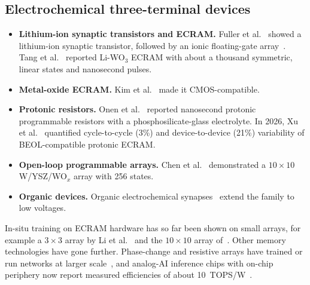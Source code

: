 \subsection{Electrochemical three-terminal devices}
\begin{itemize}
\item \textbf{Lithium-ion synaptic transistors and ECRAM.} Fuller et al.~\cite{fuller2017} showed a lithium-ion synaptic
      transistor, followed by an ionic floating-gate array~\cite{fuller2019}. Tang et al.~\cite{tang2018} reported Li-WO$_3$ ECRAM
      with about a thousand symmetric, linear states and nanosecond pulses.
\item \textbf{Metal-oxide ECRAM.} Kim et al.~\cite{kim2019} made it CMOS-compatible.
\item \textbf{Protonic resistors.} Onen et al.~\cite{onen2022} reported nanosecond protonic programmable resistors with a
      phosphosilicate-glass electrolyte. In 2026, Xu et al.~\cite{xu2026} quantified cycle-to-cycle (3\%) and device-to-device
      (21\%) variability of BEOL-compatible protonic ECRAM.
\item \textbf{Open-loop programmable arrays.} Chen et al.~\cite{chen2023} demonstrated a $10\times10$ W/YSZ/WO$_x$ array with
      256 states.
\item \textbf{Organic devices.} Organic electrochemical synapses~\cite{vandeburgt2017} extend the family to low voltages.
\end{itemize}
In-situ training on ECRAM hardware has so far been shown on small arrays, for example a $3\times3$ array by Li et
al.~\cite{li2021ecram} and the $10\times10$ array of~\cite{chen2023}. Other memory technologies have gone further. Phase-change and
resistive arrays have trained or run networks at larger scale~\cite{prezioso2015,ambrogio2018,yao2020,wan2022}, and analog-AI
inference chips with on-chip periphery now report measured efficiencies of about 10~TOPS/W~\cite{ambrogio2023,legallo2023}.
